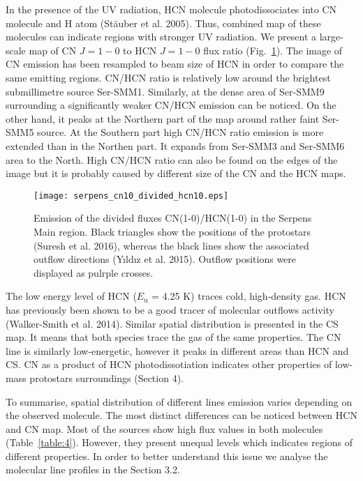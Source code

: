 \documentclass{aa}
\begin{document}
In the presence of the UV radiation, HCN molecule photodissociates into CN molecule and H atom (Stäuber et al. 2005). Thus, combined map of these molecules can indicate regions with stronger UV radiation. We present a large-scale map of CN $J=1-0$ to HCN $J=1-0$ flux ratio (Fig.~\ref{cn10_div_hcn10}). The image of CN emission has been resampled to beam size of HCN in order to compare the same emitting regions. CN/HCN ratio is relatively low around the brightest submillimetre source Ser-SMM1. Similarly, at the dense area of Ser-SMM9 surrounding a significantly weaker CN/HCN emission can be noticed. On the other hand, it peaks at the Northern part of the map around rather faint Ser-SMM5 source. At the Southern part high CN/HCN ratio emission is more extended than in the Northen part. It expands from Ser-SMM3 and Ser-SMM6 area to the North. High CN/HCN ratio can also be found on the edges of the image but it is probably caused by different size of the CN and the HCN maps.

\begin{figure}
   \centering
   \texttt{[image: serpens\_cn10\_divided\_hcn10.eps]}
      \caption{Emission of the divided fluxes CN(1-0)/HCN(1-0) in the Serpens Main region. Black triangles show the positions of the protostars (Suresh et al. 2016), whereas the black lines show the associated outflow directions (Y{\i}ld{\i}z et al. 2015). Outflow positions were displayed as pulrple crosses.}
         \label{cn10_div_hcn10}
   \end{figure}

The low energy level of HCN ($E_\mathrm{u}$ = 4.25 K) traces cold, high-density gas. HCN has previously been shown to be a good tracer of molecular outflows activity (Walker-Smith et al. 2014). Similar spatial distribution is presented in the CS map. It means that both species trace the gas of the same properties. The CN line is similarly low-energetic, however it peaks in different areas than HCN and CS. CN as a product of HCN photodissotiation indicates other properties of low-mass protostars surroundings (Section 4).

To summarise, spatial distribution of different lines emission varies depending on the observed molecule. The most distinct differences can be noticed between HCN and CN map. Most of the sources show high flux values in both molecules (Table~\ref{table:4}). However, they present unequal levels which indicates regions of different properties. In order to better understand this issue we analyse the molecular line profiles in the Section 3.2. 
\end{document}
